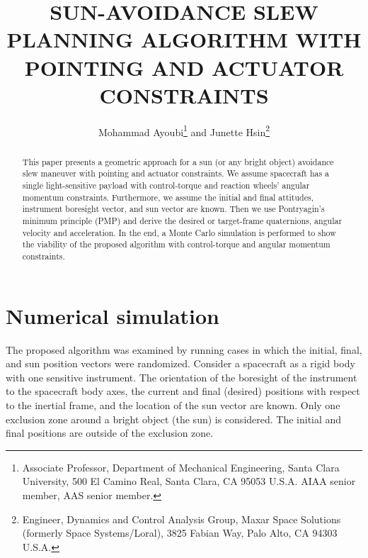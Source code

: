 \documentclass[letterpaper, preprint, paper,11pt]{AAS}	%
\begin{document}
	
	\title{SUN-AVOIDANCE SLEW PLANNING ALGORITHM WITH POINTING AND ACTUATOR CONSTRAINTS}
	
	\author{
		Mohammad Ayoubi\thanks{Associate Professor, Department of Mechanical Engineering, Santa Clara University, 500 El Camino Real, Santa Clara, CA 95053 U.S.A. AIAA senior member, AAS senior member.} and Junette Hsin\thanks{Engineer, Dynamics and Control Analysis Group, Maxar Space Solutions (formerly Space Systems/Loral), 3825 Fabian Way, Palo Alto, CA 94303 U.S.A.}
	}
	
	
	\maketitle{} 		
	
	
	\begin{abstract}
		
		This paper presents a geometric approach for a sun (or any bright object) avoidance slew maneuver with pointing and actuator constraints. We assume spacecraft has a single light-sensitive payload with control-torque and reaction wheels' angular momentum constraints. Furthermore, we assume the initial and final attitudes, instrument boresight vector, and sun vector are known. Then we use Pontryagin's minimum principle (PMP) and derive the desired or target-frame quaternions, angular velocity and acceleration. In the end, a Monte Carlo simulation is performed to show the viability of the proposed algorithm with control-torque and angular momentum constraints. 
	\end{abstract}


	\section{Numerical simulation} 
	The proposed algorithm was examined by running cases in which the initial, final, and sun position vectors were randomized. Consider a spacecraft as a rigid body with one sensitive instrument. The orientation of the boresight of the instrument to the spacecraft body axes, the current and final (desired) positions with respect to the inertial frame, and the location of the sun vector are known. Only one exclusion zone around a bright object (the sun) is considered. The initial and final positions are outside of the exclusion zone.  
	
\end{document}
